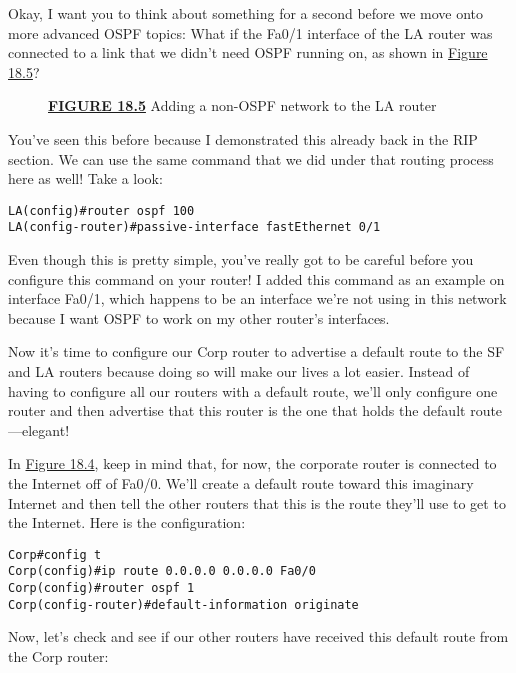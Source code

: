 Okay, I want you to think about something for a second before we move
onto more advanced OSPF topics: What if the Fa0/1 interface of the LA
router was connected to a link that we didn't need OSPF running on, as
shown in \protect\hyperlink{c18.xhtmlux5cux23figure18-5}{Figure 18.5}?

\begin{figure}
\centering
\caption{{\protect\hyperlink{c18.xhtmlux5cux23figureanchor18-5}{\textbf{FIGURE
18.5}} Adding a non-OSPF network to the LA router}}
\end{figure}

You've seen this before because I demonstrated this already back in the
RIP section. We can use the same command that we did under that routing
process here as well! Take a look:

\begin{verbatim}
LA(config)#router ospf 100
LA(config-router)#passive-interface fastEthernet 0/1
\end{verbatim}

Even though this is pretty simple, you've really got to be careful
before you configure this command on your router! I added this command
as an example on interface Fa0/1, which happens to be an interface we're
not using in this network because I want OSPF to work on my other
router's interfaces.

\protect\hypertarget{c18.xhtmlux5cux23Page_761}{}{}Now it's time to
configure our Corp router to advertise a default route to the SF and LA
routers because doing so will make our lives a lot easier. Instead of
having to configure all our routers with a default route, we'll only
configure one router and then advertise that this router is the one that
holds the default route---elegant!

In \protect\hyperlink{c18.xhtmlux5cux23figure18-4}{Figure 18.4}, keep in
mind that, for now, the corporate router is connected to the Internet
off of Fa0/0. We'll create a default route toward this imaginary
Internet and then tell the other routers that this is the route they'll
use to get to the Internet. Here is the configuration:

\begin{verbatim}
Corp#config t
Corp(config)#ip route 0.0.0.0 0.0.0.0 Fa0/0
Corp(config)#router ospf 1
Corp(config-router)#default-information originate
\end{verbatim}

Now, let's check and see if our other routers have received this default
route from the Corp router:

